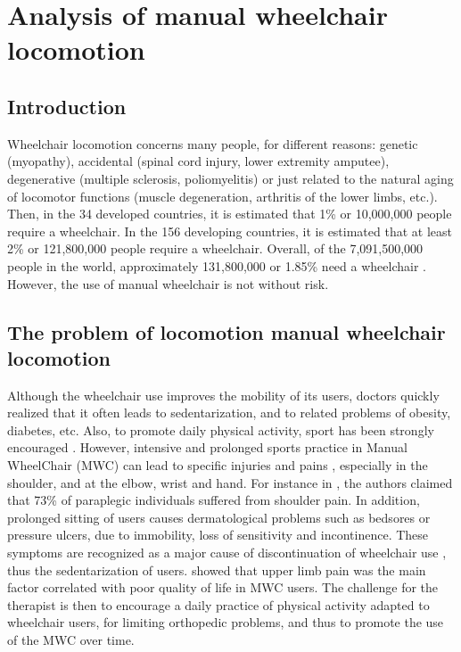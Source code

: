 \chapter[Wheelchair locomotion]{Analysis of manual wheelchair locomotion}
\label{locomotion_analysis}
\section{Introduction}
Wheelchair locomotion concerns many people, for different reasons: genetic  (myopathy), accidental (spinal cord injury, lower extremity amputee), degenerative (multiple sclerosis, poliomyelitis) or just related to the natural aging of locomotor functions (muscle degeneration, arthritis of the lower limbs, etc.). Then, in the 34 developed countries, it is estimated that 1\% or 10,000,000 people require a wheelchair. In the 156 developing countries, it is estimated that at least 2\% or 121,800,000 people require a wheelchair. Overall, of the 7,091,500,000 people in the world, approximately 131,800,000 or 1.85\% need a wheelchair \cite{Needs2016}. However, the use of manual wheelchair is not without risk.

\section[Problem]{The problem of locomotion manual wheelchair locomotion}
\label{problem}
Although the wheelchair use improves the mobility of its users, doctors quickly realized that it often leads to sedentarization, and to related problems of obesity, diabetes, etc. Also, to promote daily physical activity, sport has been strongly encouraged \cite{machida2013resilience}. However, intensive and prolonged sports practice in Manual WheelChair (MWC) can lead to specific injuries and pains \cite{johnson2004sport}, especially in the shoulder, and at the elbow, wrist and hand. For instance in \cite{pentland1991weight}, the  authors claimed that 73\%  of paraplegic individuals suffered from shoulder pain. In addition, prolonged sitting of   users causes dermatological problems such as bedsores or pressure ulcers, due to immobility, loss of sensitivity and incontinence. These symptoms are recognized as a major cause of discontinuation of wheelchair use \cite{van2006manual}  \cite{ville2006work}, thus the sedentarization of users.  \cite{lundqvist1991spinal} showed that upper limb pain was the main factor correlated with poor quality of life in MWC users. The challenge for the therapist is then to encourage a daily practice of physical activity adapted to  wheelchair users, for limiting orthopedic problems,  and thus to promote the use of the MWC over time.


